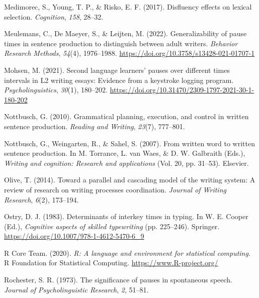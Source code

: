 \documentclass[
  man,floatsintext]{apa7}
\newlength{\cslhangindent}
\newlength{\cslentryspacingunit} %
\newenvironment{CSLReferences}[2] %
 {%
  \setlength{\parindent}{0pt}
  \ifodd #1
  \let\oldpar\par
  \def\par{\hangindent=\cslhangindent\oldpar}
  \fi
  \setlength{\parskip}{#2\cslentryspacingunit}
 }%
 {}
\begin{document}
\begin{CSLReferences}{1}{0}
\leavevmode{}%
Medimorec, S., Young, T. P., \& Risko, E. F. (2017). Disfluency effects on lexical selection. \emph{Cognition}, \emph{158}, 28--32.

\leavevmode{}%
Meulemans, C., De Maeyer, S., \& Leijten, M. (2022). Generalizability of pause times in sentence production to distinguish between adult writers. \emph{Behavior Research Methods}, \emph{54}(4), 1976--1988. \url{https://doi.org/10.3758/s13428-021-01707-1}

\leavevmode{}%
Mohsen, M. (2021). Second language learners' pauses over different times intervals in {L2} writing essays: Evidence from a keystroke logging program. \emph{Psycholinguistics}, \emph{30}(1), 180--202. \url{https://doi.org/10.31470/2309-1797-2021-30-1-180-202}

\leavevmode{}%
Nottbusch, G. (2010). Grammatical planning, execution, and control in written sentence production. \emph{Reading and Writing}, \emph{23}(7), 777--801.

\leavevmode{}%
Nottbusch, G., Weingarten, R., \& Sahel, S. (2007). From written word to written sentence production. In M. Torrance, L. van Waes, \& D. W. Galbraith (Eds.), \emph{Writing and cognition: Research and applications} (Vol. 20, pp. 31--53). Elsevier.

\leavevmode{}%
Olive, T. (2014). Toward a parallel and cascading model of the writing system: {A} review of research on writing processes coordination. \emph{Journal of Writing Research}, \emph{6}(2), 173--194.

\leavevmode{}%
Ostry, D. J. (1983). Determinants of interkey times in typing. In W. E. Cooper (Ed.), \emph{Cognitive aspects of skilled typewriting} (pp. 225--246). Springer. \url{https://doi.org/10.1007/978-1-4612-5470-6_9}

\leavevmode{}%
R Core Team. (2020). \emph{R: A language and environment for statistical computing}. R Foundation for Statistical Computing. \url{https://www.R-project.org/}

\leavevmode{}%
Rochester, S. R. (1973). The significance of pauses in spontaneous speech. \emph{Journal of Psycholinguistic Research}, \emph{2}, 51--81.


\end{CSLReferences}
\end{document}

